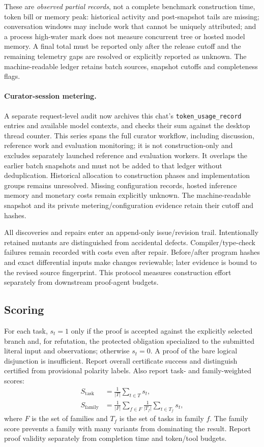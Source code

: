 \documentclass{article}
\begin{document}
These are \emph{observed partial records}, not a complete benchmark construction time, token bill or memory peak: historical activity and post-snapshot tails are missing; conversation windows may include work that cannot be uniquely attributed; and a process high-water mark does not measure concurrent tree or hosted model memory. A final total must be reported only after the release cutoff and the remaining telemetry gaps are resolved or explicitly reported as unknown. The machine-readable ledger retains batch sources, snapshot cutoffs and completeness flags.

\paragraph{Curator-session metering.} A separate request-level audit now archives this chat's \texttt{token\_usage\_record} entries and available model contexts, and checks their sum against the desktop thread counter. This series spans the full curator workflow, including discussion, reference work and evaluation monitoring; it is not construction-only and excludes separately launched reference and evaluation workers. It overlaps the earlier batch snapshots and must not be added to that ledger without deduplication. Historical allocation to construction phases and implementation groups remains unresolved. Missing configuration records, hosted inference memory and monetary costs remain explicitly unknown. The machine-readable snapshot and its private metering/configuration evidence retain their cutoff and hashes.

All discoveries and repairs enter an append-only issue/revision trail. Intentionally retained mutants are distinguished from accidental defects. Compiler/type-check failures remain recorded with costs even after repair. Before/after program hashes and exact differential inputs make changes reviewable; later evidence is bound to the revised source fingerprint. This protocol measures construction effort separately from downstream proof-agent budgets.

\subsection{Scoring}

For each task, $s_t=1$ only if the proof is accepted against the explicitly selected branch and, for refutation, the protected obligation specialized to the submitted literal input and observations; otherwise $s_t=0$. A proof of the bare logical disjunction is insufficient. Report overall certificate success and distinguish certified from provisional polarity labels. Also report task- and family-weighted scores:
\begin{align}
  S_{\mathrm{task}} &= \frac{1}{|T|}\sum_{t\in T}s_t, \\
  S_{\mathrm{family}} &= \frac{1}{|F|}\sum_{f\in F}
       \frac{1}{|T_f|}\sum_{t\in T_f}s_t,
\end{align}
where $F$ is the set of families and $T_f$ is the set of tasks in family $f$. The family score prevents a family with many variants from dominating the result. Report proof validity separately from completion time and token/tool budgets.
\end{document}
